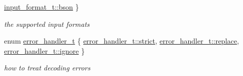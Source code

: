 \begin{DoxyCompactItemize}
\newline
\mbox{\hyperlink{namespacenlohmann_1_1detail_aa554fc6a11519e4f347deb25a9f0db40a0b6879b186bfb2b1ec65d2460e4eccd4}{input\+\_\+format\+\_\+t\+::bson}}
 \}
\begin{DoxyCompactList}\small\item\em the supported input formats \end{DoxyCompactList}\item 
enum \mbox{\hyperlink{namespacenlohmann_1_1detail_a5a76b60b26dc8c47256a996d18d967df}{error\+\_\+handler\+\_\+t}} \{ \mbox{\hyperlink{namespacenlohmann_1_1detail_a5a76b60b26dc8c47256a996d18d967dfa2133fd717402a7966ee88d06f9e0b792}{error\+\_\+handler\+\_\+t\+::strict}}, 
\mbox{\hyperlink{namespacenlohmann_1_1detail_a5a76b60b26dc8c47256a996d18d967dfa9dde360102c103867bd2f45872f1129c}{error\+\_\+handler\+\_\+t\+::replace}}, 
\mbox{\hyperlink{namespacenlohmann_1_1detail_a5a76b60b26dc8c47256a996d18d967dfa567bc1d268f135496de3d5b946b691f3}{error\+\_\+handler\+\_\+t\+::ignore}}
 \}
\begin{DoxyCompactList}\small\item\em how to treat decoding errors \end{DoxyCompactList}\end{DoxyCompactItemize}
